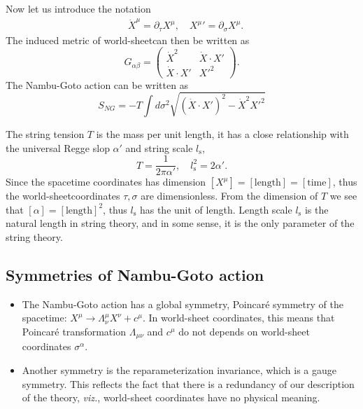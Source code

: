 \documentclass[graybox,envcountchap,sectrefs]{svmono}
\begin{document}
Now let us introduce the notation
\begin{align}
&\dot{X}^{\mu}=\partial_{\tau}X^{\mu}, \quad {X^{\mu}}'=\partial_{\sigma}X^{\mu}.
\end{align}
The induced metric of world-sheetcan then be written as
\begin{equation}
G_{\alpha\beta}=\left(\begin{array}{cc}\dot{X}^2 & \dot{X}\cdot X' \\ \dot{X}\cdot X'  & {X'}^2\end{array}\right).
\end{equation}
The Nambu-Goto action can be written as
\begin{equation}
\boxed{S_{NG}=-T\int d\sigma^2 \sqrt{(\dot{X}\cdot X' )^2-\dot{X}^2 {X'}^2}}
\end{equation}

The string tension $T$ is the mass per unit length, it has a close relationship with the universal Regge slop $\alpha'$ and string scale $l_{\mathrm{s}}$,
\begin{equation}
T=\frac{1}{2\pi \alpha'},\quad l_{\mathrm{s}}^2=2\alpha'.
\end{equation}
Since the spacetime coordinates has dimension $[X^{\mu}]=[\text{length}]=[\text{time}]$, thus the world-sheetcoordinates $\tau,\sigma$ are dimensionless. From the dimension of $T$ we see that $[\alpha]=[\text{length}]^2$, thus $l_{\mathrm{s}}$ has the unit of length. Length scale $l_{\mathrm{s}}$ is the natural length in string theory, and in some sense, it is the only parameter of the string theory.



\subsection{Symmetries of Nambu-Goto action}

\begin{itemize}
	\item The Nambu-Goto action has a global symmetry, Poincar\'{e} symmetry of the spacetime: $X^{\mu}\to \Lambda^{\mu}_{\nu}X^{\nu}+c^{\mu}$. In world-sheet coordinates, this means that Poincar\'{e} transformation $\Lambda_{\mu\nu}$ and $c^{\mu}$ do not depends on world-sheet coordinates $\sigma^{\alpha}$.

\item Another symmetry is the reparameterization invariance, which is a gauge symmetry. 
This reflects the fact that there is a redundancy of our description of the theory, \emph{viz.}, world-sheet coordinates have no physical meaning.
\end{itemize}
\end{document}

